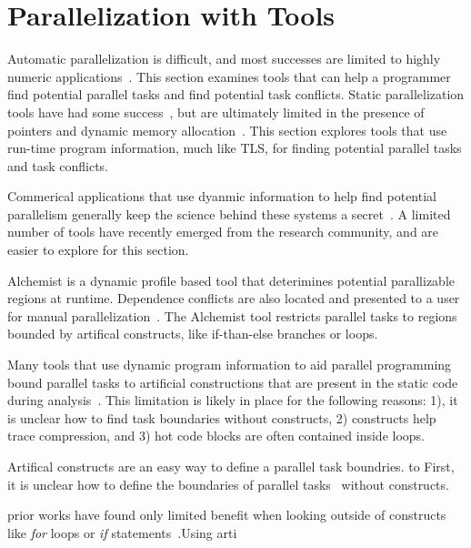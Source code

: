 \documentclass[defaultstyle,11pt]{thesis}
\begin{document}
\section{Parallelization with Tools}
\label{sec:paralleltools}

Automatic parallelization is difficult, and most successes are limited
to highly numeric
applications~\cite{larus:1993:pads,ramaseshan:08:nc}.  This section
examines tools that can help a programmer find potential parallel
tasks and find potential task conflicts.  Static parallelization tools
have had some success~\cite{kennedy:91:pads}, but are ultimately
limited in the presence of pointers and dynamic memory
allocation~\cite{minjang:10:micro}. This section explores tools that
use run-time program information, much like TLS, for finding potential
parallel tasks and task conflicts.

Commerical applications that use dyanmic information to help find
potential parallelism generally keep the science behind these systems
a secret~\cite{cogswell:2010:eweek, vectorfabrics:11:ws}.  A limited
number of tools have recently emerged from the research community, and
are easier to explore for this section.

Alchemist is a dynamic profile based tool that deterimines potential
parallizable regions at runtime.  Dependence conflicts are also
located and presented to a user for manual
parallelization~\cite{zhang:09:cgo}.  The Alchemist tool restricts
parallel tasks to regions bounded by artifical constructs, like
if-than-else branches or loops.

Many tools that use dynamic program information to aid parallel
programming bound parallel tasks to artificial constructions that are
present in the static code during analysis~\cite{zhang:09:cgo,
  minjang:10:micro, jeon:2011:hotpar, garcia:2011:pldi}.  This
limitation is likely in place for the following reasons: 1), it is
unclear how to find task boundaries without constructs, 2) constructs
help trace compression, and 3) hot code blocks are often contained inside
loops.

Artifical constructs are an easy way to define a parallel task
boundries.  to First, it is unclear how to define the boundaries of
parallel tasks~\cite{jeon:2011:hotpar, garcia:2011:pldi} without
constructs.

prior works have found only limited benefit
when looking outside of constructs like \textit{for} loops or
\textit{if} statements~\cite{rinard:93:computer,rul:2008:sc}.Using
arti
\end{document}
